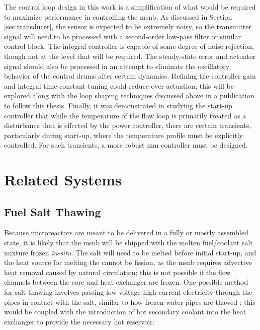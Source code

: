 The control loop design in this work is a simplification of what would be required to maximize performance in controlling the \acs{msnb}. As discussed in Section \ref{sec:transducer}, the sensor is expected to be extremely noisy, so the transmitter signal will need to be processed with a second-order low-pass filter or similar control block. The integral controller is capable of some degree of noise rejection, though not at the level that will be required.  The steady-state error and actuator signal should also be processed in an attempt to eliminate the oscillatory behavior of the control drums after certain dynamics. Refining the controller gain and integral time-constant tuning could reduce over-actuation; this will be explored along with the loop shaping techniques discussed above in a publication to follow this thesis. Finally, it was demonstrated in studying the start-up controller that while the temperature of the flow loop is primarily treated as a disturbance that is effected by the power controller, there are certain transients, particularly during start-up, where the temperature profile must be explicitly controlled. For such transients, a more robust \acs{mm} controller must be designed.


\section{Related Systems}\label{Chapter:Conclusions-FutureWork}
\subsection{Fuel Salt Thawing}
Because microreactors are meant to be delivered in a fully or mostly assembled state, it is likely that the \acs{msnb} will be shipped with the molten fuel/coolant salt mixture frozen \textit{in-situ}. The salt will need to be melted before initial start-up, and the heat source for melting the cannot be fission, as the \acs{msnb} requires advective heat removal caused by natural circulation; this is not possible if the flow channels between the core and heat exchanger are frozen. One possible method for salt thawing involves passing low-voltage high-current electricity through the pipes in contact with the salt, similar to how frozen water pipes are thawed \cite{Thawing}; this would be coupled with the introduction of hot secondary coolant into the heat exchanger to provide the necessary hot reservoir.

